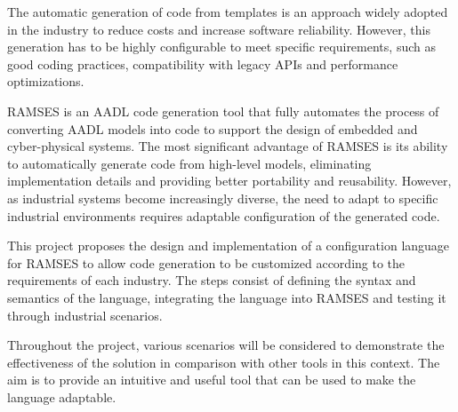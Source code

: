 
%

The automatic generation of code from templates is an approach widely adopted in the industry to reduce costs and increase software reliability. However, this generation has to be highly configurable to meet specific requirements, such as good coding practices, compatibility with legacy APIs and performance optimizations.

RAMSES is an AADL code generation tool that fully automates the process of converting AADL models into code to support the design of embedded and cyber-physical systems. The most significant advantage of RAMSES is its ability to automatically generate code from high-level models, eliminating implementation details and providing better portability and reusability. However, as industrial systems become increasingly diverse, the need to adapt to specific industrial environments requires adaptable configuration of the generated code.

This project proposes the design and implementation of a configuration language for RAMSES to allow code generation to be customized according to the requirements of each industry. The steps consist of defining the syntax and semantics of the language, integrating the language into RAMSES and testing it through industrial scenarios.

Throughout the project, various scenarios will be considered to demonstrate the effectiveness of the solution in comparison with other tools in this context. The aim is to provide an intuitive and useful tool that can be used to make the language adaptable.

